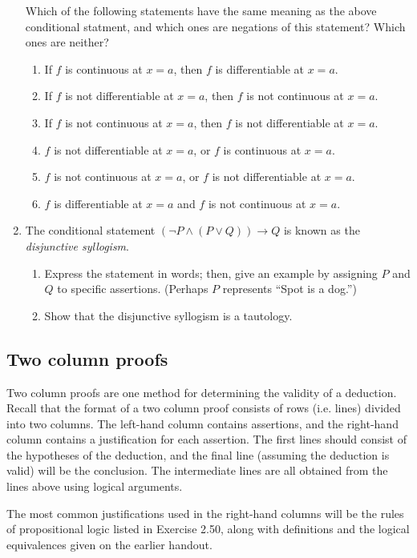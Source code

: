 \documentclass[letterpaper,12pt]{article}
\begin{document}
\begin{enumerate}
Which of the following statements have the same meaning as the above conditional statment, and which ones are negations of this statement? Which ones are neither?
\begin{enumerate}
 \item If $f$ is continuous at $x=a$, then $f$ is differentiable at $x=a$.
 \item If $f$ is not differentiable at $x=a$, then $f$ is not continuous at $x=a$.
 \item If $f$ is not continuous at $x=a$, then $f$ is not differentiable at $x=a$.
 \item $f$ is not differentiable at $x=a$, or $f$ is continuous at $x=a$.
 \item $f$ is not continuous at $x=a$, or $f$ is not differentiable at $x=a$.
 \item $f$ is differentiable at $x=a$ and $f$ is not continuous at $x=a$.
\end{enumerate}
\item The conditional statement $(\neg P \wedge (P\vee Q))\to Q$ is known as the {\em disjunctive syllogism}.
\begin{enumerate}
\item Express the statement in words; then, give an example by assigning $P$ and $Q$ to specific assertions. (Perhaps $P$ represents ``Spot is a dog.'')
\item Show that the disjunctive syllogism is a tautology.
\end{enumerate}
\end{enumerate}
\subsection*{Two column proofs}
Two column proofs are one method for determining the validity of a deduction. Recall that the format of a two column proof consists of rows (i.e. lines) divided into two columns. The left-hand column contains assertions, and the right-hand column contains a justification for each assertion. The first lines should consist of the hypotheses of the deduction, and the final line (assuming the deduction is valid) will be the conclusion. The intermediate lines are all obtained from the lines above using logical arguments. 

The most common justifications used in the right-hand columns will be the rules of propositional logic listed in Exercise 2.50, along with definitions and the logical equivalences given on the earlier handout. 
\end{document}
